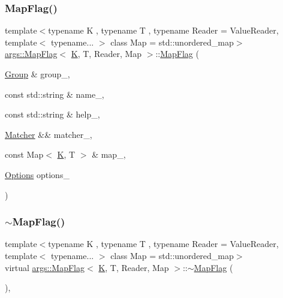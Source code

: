 \subsubsection{\texorpdfstring{Map\+Flag()}{MapFlag()}\hspace{0.1cm}{\footnotesize\ttfamily [3/3]}}
{\footnotesize\ttfamily template$<$typename K , typename T , typename Reader  = Value\+Reader, template$<$ typename... $>$ class Map = std\+::unordered\+\_\+map$>$ \\
\hyperlink{classargs_1_1_map_flag}{args\+::\+Map\+Flag}$<$ \hyperlink{cgal__test_8cpp_a891e241aa245ae63618f03737efba309}{K}, T, Reader, Map $>$\+::\hyperlink{classargs_1_1_map_flag}{Map\+Flag} (\begin{DoxyParamCaption}\item[{\hyperlink{classargs_1_1_group}{Group} \&}]{group\+\_\+,  }\item[{const std\+::string \&}]{name\+\_\+,  }\item[{const std\+::string \&}]{help\+\_\+,  }\item[{\hyperlink{classargs_1_1_matcher}{Matcher} \&\&}]{matcher\+\_\+,  }\item[{const Map$<$ \hyperlink{cgal__test_8cpp_a891e241aa245ae63618f03737efba309}{K}, T $>$ \&}]{map\+\_\+,  }\item[{\hyperlink{namespaceargs_aa530c0f95194aa275f49a5f299ac9e77}{Options}}]{options\+\_\+ }\end{DoxyParamCaption})\hspace{0.3cm}{\ttfamily [inline]}}

\mbox{\label{classargs_1_1_map_flag_a67afdb4326dcef52941a230fc188d54b}} 
\subsubsection{\texorpdfstring{$\sim$\+Map\+Flag()}{~MapFlag()}}
{\footnotesize\ttfamily template$<$typename K , typename T , typename Reader  = Value\+Reader, template$<$ typename... $>$ class Map = std\+::unordered\+\_\+map$>$ \\
virtual \hyperlink{classargs_1_1_map_flag}{args\+::\+Map\+Flag}$<$ \hyperlink{cgal__test_8cpp_a891e241aa245ae63618f03737efba309}{K}, T, Reader, Map $>$\+::$\sim$\hyperlink{classargs_1_1_map_flag}{Map\+Flag} (\begin{DoxyParamCaption}{ }\end{DoxyParamCaption})\hspace{0.3cm}{\ttfamily [inline]}, {\ttfamily [virtual]}}



